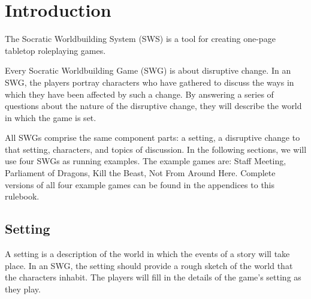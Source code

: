\documentclass[12pt, a5paper, parskip=half-, footheight=1.4cm]{scrartcl}
\begin{document}
\setmainfont{URW Classico}
\normalsize




\center

\setcounter{page}{1}

\raggedright
\section*{Introduction} \label{section:introduction}
The Socratic Worldbuilding System (SWS) is a tool for creating one-page tabletop roleplaying games.

Every Socratic Worldbuilding Game (SWG) is about disruptive change.
In an SWG, the players portray characters who have gathered to discuss the ways in which they have been affected by such a change.
By answering a series of questions about the nature of the disruptive change, they will describe the world in which the game is set.

All SWGs comprise the same component parts: a setting, a disruptive change to that setting, characters, and topics of discussion.
In the following sections, we will use four SWGs as running examples.
The example games are: Staff Meeting, Parliament of Dragons, Kill the Beast, Not From Around Here.
Complete versions of all four example games can be found in the appendices to this rulebook.


\newpage

\subsection*{Setting}
A setting is a description of the world in which the events of a story will take place.
In an SWG, the setting should provide a rough sketch of the world that the characters inhabit.
The players will fill in the details of the game's setting as they play.
\end{document}
